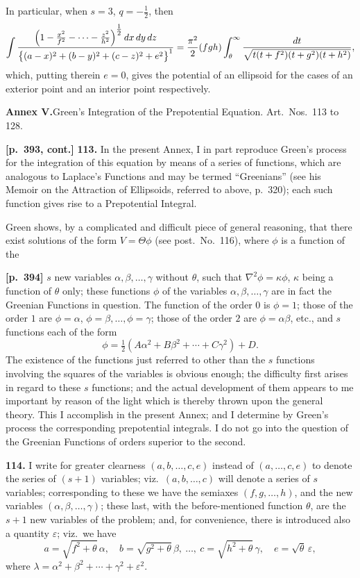 \documentclass[11pt,a4paper]{article}
\begin{document}
In particular, when $s = 3$, $q = -\tfrac{1}{2}$, then
\[
\int \frac{\Bigl(1 - \tfrac{x^{2}}{f^{2}} - \cdots - \tfrac{z^{2}}{h^{2}}\Bigr)^{\tfrac{1}{2}}\,dx\,dy\,dz}{\bigl\{(a-x)^{2} + (b-y)^{2} + (c-z)^{2} + e^{2}\bigr\}^{1}}
= \frac{\pi^{2}}{2}(f g h)\int_{\theta}^{\infty}\frac{dt}{\sqrt{t(t+f^{2})(t+g^{2})(t+h^{2})}},
\]
which, putting therein $e = 0$, gives the potential of an ellipsoid for the cases of an exterior point and an interior point respectively.

\bigskip
\begin{center}
\textbf{Annex V.}\quad Green's Integration of the Prepotential Equation. Art.\ Nos.~113 to 128.
\end{center}

\noindent\textbf{[p.~393, cont.]}\quad
\textbf{113.} In the present Annex, I in part reproduce Green's process for the integration of this equation by means of a series of functions, which are analogous to Laplace's Functions and may be termed ``Greenians'' (see his Memoir on the Attraction of Ellipsoids, referred to above, p.~320); each such function gives rise to a Prepotential Integral.

Green shows, by a complicated and difficult piece of general reasoning, that there exist solutions of the form $V = \Theta\phi$ (see post.\ No.~116), where $\phi$ is a function of the

\noindent\textbf{[p.~394]}\quad
$s$ new variables $\alpha, \beta, \ldots, \gamma$ without $\theta$, such that $\nabla^{2}\phi = \kappa\phi$, $\kappa$ being a function of $\theta$ only; these functions $\phi$ of the variables $\alpha, \beta, \ldots, \gamma$ are in fact the Greenian Functions in question. The function of the order $0$ is $\phi = 1$; those of the order $1$ are $\phi = \alpha$, $\phi = \beta, \ldots, \phi = \gamma$; those of the order $2$ are $\phi = \alpha\beta$, etc., and $s$ functions each of the form
\[
\phi = \tfrac{1}{2}(A\alpha^{2} + B\beta^{2} + \cdots + C\gamma^{2}) + D.
\]
The existence of the functions just referred to other than the $s$ functions involving the squares of the variables is obvious enough; the difficulty first arises in regard to these $s$ functions; and the actual development of them appears to me important by reason of the light which is thereby thrown upon the general theory. This I accomplish in the present Annex; and I determine by Green's process the corresponding prepotential integrals. I do not go into the question of the Greenian Functions of orders superior to the second.

\textbf{114.} I write for greater clearness $(a, b, \ldots, c, e)$ instead of $(a, \ldots, c, e)$ to denote the series of $(s + 1)$ variables; viz.\ $(a, b, \ldots, c)$ will denote a series of $s$ variables; corresponding to these we have the semiaxes $(f, g, \ldots, h)$, and the new variables $(\alpha, \beta, \ldots, \gamma)$; these last, with the before-mentioned function $\theta$, are the $s + 1$ new variables of the problem; and, for convenience, there is introduced also a quantity $\varepsilon$; viz.\ we have
\[
a = \sqrt{f^{2}+\theta}\,\alpha,\quad b = \sqrt{g^{2}+\theta}\,\beta,\ \ldots,\ c = \sqrt{h^{2}+\theta}\,\gamma,\quad e = \sqrt{\theta}\,\varepsilon,
\]
where $\lambda = \alpha^{2} + \beta^{2} + \cdots + \gamma^{2} + \varepsilon^{2}$.
\end{document}
